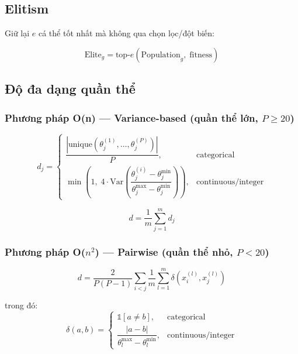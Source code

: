 \documentclass[12pt,a4paper]{article}
\begin{document}
\subsection{Elitism}

Giữ lại $e$ cá thể tốt nhất mà không qua chọn lọc/đột biến:

\begin{equation}
    \text{Elite}_g = \text{top-}e\!\left(\text{Population}_g,\; \text{fitness}\right)
    \label{eq:elitism}
\end{equation}

\subsection{Độ đa dạng quần thể}

\subsubsection{Phương pháp O(n) --- Variance-based (quần thể lớn, $P \geq 20$)}

\begin{equation}
    d_j =
    \begin{cases}
        \dfrac{|\text{unique}(\theta_j^{(1)}, \ldots, \theta_j^{(P)})|}{P},
            & \text{categorical} \\[8pt]
        \min\!\left(1,\; 4 \cdot \text{Var}\!\left(\dfrac{\theta_j^{(i)} - \theta_j^{\min}}
            {\theta_j^{\max} - \theta_j^{\min}}\right)\right),
            & \text{continuous/integer}
    \end{cases}
    \label{eq:diversity_fast}
\end{equation}

\begin{equation}
    d = \frac{1}{m} \sum_{j=1}^{m} d_j
    \label{eq:diversity_mean}
\end{equation}

\subsubsection{Phương pháp O($n^2$) --- Pairwise (quần thể nhỏ, $P < 20$)}

\begin{equation}
    d = \frac{2}{P(P-1)} \sum_{i < j} \frac{1}{m}
    \sum_{l=1}^{m} \delta(x_i^{(l)}, x_j^{(l)})
    \label{eq:diversity_pairwise}
\end{equation}

\noindent trong đó:
\begin{equation}
    \delta(a, b) =
    \begin{cases}
        \mathbb{1}[a \neq b], & \text{categorical} \\
        \dfrac{|a - b|}{\theta_l^{\max} - \theta_l^{\min}}, & \text{continuous/integer}
    \end{cases}
\end{equation}
\end{document}

